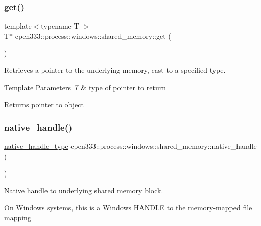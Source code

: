 \subsubsection{\texorpdfstring{get()}{get()}\hspace{0.1cm}{\footnotesize\ttfamily [3/3]}}
{\footnotesize\ttfamily template$<$typename T $>$ \\
T$\ast$ cpen333\+::process\+::windows\+::shared\+\_\+memory\+::get (\begin{DoxyParamCaption}{ }\end{DoxyParamCaption})\hspace{0.3cm}{\ttfamily [inline]}}



Retrieves a pointer to the underlying memory, cast to a specified type. 


\begin{DoxyTemplParams}{Template Parameters}
{\em T} & type of pointer to return \\
\hline
\end{DoxyTemplParams}
\begin{DoxyReturn}{Returns}
pointer to object 
\end{DoxyReturn}
\mbox{\label{classcpen333_1_1process_1_1windows_1_1shared__memory_a1827dd03341d7c6afcc02cf078f54e32}} 
\subsubsection{\texorpdfstring{native\+\_\+handle()}{native\_handle()}}
{\footnotesize\ttfamily \hyperlink{classcpen333_1_1process_1_1windows_1_1shared__memory_a92d977097375f7b87d5702b7da666267}{native\+\_\+handle\+\_\+type} cpen333\+::process\+::windows\+::shared\+\_\+memory\+::native\+\_\+handle (\begin{DoxyParamCaption}{ }\end{DoxyParamCaption})\hspace{0.3cm}{\ttfamily [inline]}}



Native handle to underlying shared memory block. 

On Windows systems, this is a Windows H\+A\+N\+D\+LE to the memory-\/mapped file mapping

